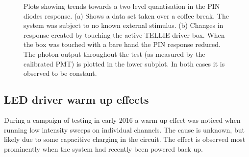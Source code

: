 \documentclass[12pt]{report}
\begin{document}
\begin{figure}[htp]
	\centering
	\caption{Plots showing trends towards a two level quantisation in the PIN diodes response. (a) Shows a data set taken over a coffee break. The system was subject to no known external stimulus. (b) Changes in response created by touching the active TELLIE driver box. When the box was touched with a bare hand the PIN response reduced. The photon output throughout the test (as measured by the calibrated PMT) is plotted in the lower subplot. In both cases it is observed to be constant.}
	\label{fig:PINQuantisation} 
\end{figure}

\subsection{LED driver warm up effects}
During a campaign of testing in early 2016 a warm up effect was noticed when running low intensity sweeps on individual channels. The cause is unknown, but likely due to some capacitive charging in the circuit. The effect is observed most prominently when the system had recently been powered back up. 
\end{document}
